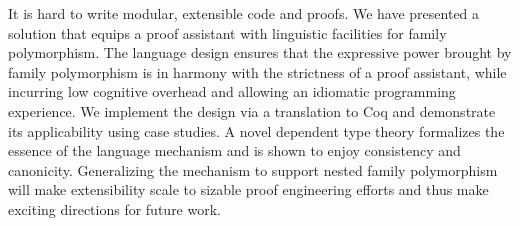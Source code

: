 It is hard to write modular, extensible code and proofs.
We have presented a solution that equips a proof assistant with
linguistic facilities for family polymorphism.
The language design ensures that the expressive power brought by family polymorphism
is in harmony with the strictness of a proof assistant, while incurring
low cognitive overhead and allowing an idiomatic programming experience.
We implement the design via a translation to Coq and demonstrate its applicability
using case studies.
A novel dependent type theory formalizes the essence of the language mechanism
and is shown to enjoy consistency and canonicity.
Generalizing the mechanism to support nested family polymorphism
will make extensibility scale to sizable proof engineering efforts and
thus make exciting directions for future work.